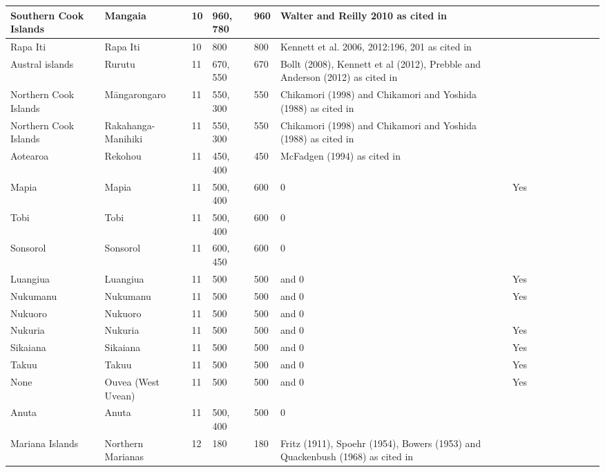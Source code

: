 \documentclass[a4paper,10pt]{article} %
\begin{document}
\begin{landscape}
\begin{longtable}{| p{3cm}| p{4cm}| p{4cm}|p{2cm}|p{2cm}|p{2cm}|p{2cm}|p{2cm}|p{2cm}|p{2cm}|p{2cm}|p{2cm}|p{2cm}|p{2cm}}
 Southern Cook Islands & Mangaia & 10 & 960, 780 & 960 & Walter and Reilly 2010 as cited in \citet{walworth2015} &   \\ \hline
 Rapa Iti & Rapa Iti & 10 & 800 & 800 & Kennett et al. 2006, 2012:196, 201 as cited in \citet{walworth2015} &   \\ \hline
 Austral islands & Rurutu & 11 & 670, 550 & 670 & Bollt (2008), Kennett et al (2012), Prebble and Anderson (2012) as cited in \citet{rieth_cochrane_2018} &   \\ \hline
 Northern Cook Islands & M\={a}ngarongaro & 11 & 550, 300 & 550 & Chikamori (1998) and Chikamori and Yoshida (1988) as cited in \citet{rieth_cochrane_2018} &   \\ \hline
 Northern Cook Islands & Rakahanga-Manihiki & 11 & 550, 300 & 550 & Chikamori (1998) and Chikamori and Yoshida (1988) as cited in \citet{rieth_cochrane_2018} &   \\ \hline
 Aotearoa & Rekohou & 11 & 450, 400 & 450 & McFadgen (1994) as cited in \citet{rieth_cochrane_2018} &   \\ \hline
 Mapia & Mapia & 11 & 500, 400 & 600 & \citet{intoh2007reconnaissance}  0 & Yes \\ \hline
 Tobi & Tobi & 11 & 500, 400 & 600 & \citet{intoh2007reconnaissance}  0 &   \\ \hline
 Sonsorol & Sonsorol & 11 & 600, 450 & 600 & \citet{intoh2008ongoing}  0 &   \\ \hline
 Luangiua & Luangiua & 11 & 500 & 500 & \citet{kirch2012basline} and \citet{carson2012recent}  0 & Yes \\ \hline
 Nukumanu & Nukumanu & 11 & 500 & 500 & \citet{kirch2012basline} and \citet{carson2012recent}  0 & Yes \\ \hline
 Nukuoro & Nukuoro & 11 & 500 & 500 & \citet{kirch2012basline} and \citet{carson2012recent}  0 &   \\ \hline
 Nukuria & Nukuria & 11 & 500 & 500 & \citet{kirch2012basline} and \citet{carson2012recent}  0 & Yes \\ \hline
 Sikaiana & Sikaiana & 11 & 500 & 500 & \citet{kirch2012basline} and \citet{carson2012recent}  0 & Yes \\ \hline
 Takuu & Takuu & 11 & 500 & 500 & \citet{kirch2012basline} and \citet{carson2012recent}  0 & Yes \\ \hline
 None & Ouvea (West Uvean) & 11 & 500 & 500 & \citet{kirch2012basline} and \citet{carson2012recent}  0 & Yes \\ \hline
 Anuta & Anuta & 11 & 500, 400 & 500 & \citet{carson2012recent}  0 &   \\ \hline
 Mariana Islands & Northern Marianas & 12 & 180 & 180 & Fritz (1911), Spoehr (1954), Bowers (1953) and Quackenbush (1968) as cited in \citet{ellis2012saipan} &   \\ \hline




 \end{longtable}
\end{landscape}
\end{document}
